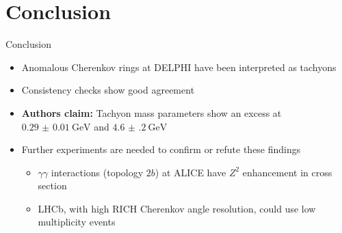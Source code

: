 \documentclass{beamer}
\begin{document}
\section{Conclusion}
\begin{frame}{Conclusion}
  \begin{itemize}
    \setlength\itemsep{1.3em}
    \item{Anomalous Cherenkov rings at DELPHI have been interpreted as tachyons}
    \item{Consistency checks show good agreement}
    \item{\textbf{Authors claim:} Tachyon mass parameters show an excess at \underline{$\SI{0.29(1)}{\giga\eV}$} and \underline{$\SI{4.6(2)}{\giga\eV}$}}
    \item{Further experiments are needed to confirm or refute these findings}
    \begin{itemize}
      \item{$\gamma\gamma$ interactions (topology $2b$) at ALICE have $Z^2$ enhancement in cross section}
      \item{LHCb, with high RICH Cherenkov angle resolution, could use low multiplicity events}
    \end{itemize}
  \end{itemize}
\end{frame}
\end{document}
